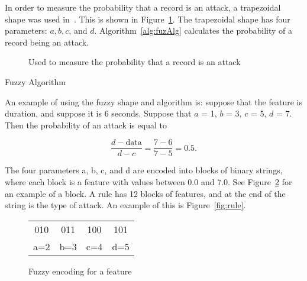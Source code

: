 \documentclass{sig-alternate}
\begin{document}
In order to measure the probability that a record is an attack, a trapezoidal shape was used in~\cite{6496342, 6559603}. This is shown in Figure~\ref{fig:trapFigure}. The trapezoidal shape has four parameters: $a, b, c$, and $d$. Algorithm~\ref{alg:fuzAlg} calculates the probability of a record being an attack.


\begin{figure}
\centering
{}
\caption{Used to measure the probability that a record is an attack}
\label{fig:trapFigure}
\end{figure}

\begin{algorithm}
\caption{Fuzzy Algorithm}
\label{alg:fuzAlg}
\begin{algorithmic}
\ELSE {}
\ENDIF
\end{algorithmic}
\end{algorithm}

An example of using the fuzzy shape and algorithm is: suppose that the feature is duration, and suppose it is 6 seconds. Suppose that $a$ = 1, $b$ = 3, $c$ = 5, $d$ = 7. Then the probability of an attack is equal to

\begin{equation*}
\frac{d-\textrm{data}}{d-c} = \frac{7-6}{7-5} = 0.5.
\end{equation*}


The four parameters a, b, c, and d are encoded into blocks of binary strings, where each block is a feature with values between 0.0 and 7.0. See Figure~\ref{fig:fuzEncodingForFeature} for an example of a block. A rule has 12 blocks of features, and at the end of the string is the type of attack. An example of this is Figure~\ref{fig:rule}.

\begin{figure}
\centering
\caption{Fuzzy encoding for a feature}
\vspace{0.20cm}
\begin{tabular}{|cccc|} \hline
010 & 011 & 100 & 101\\
a=2 & b=3 & c=4 & d=5\\
\hline\end{tabular}
\label{fig:fuzEncodingForFeature}
\end{figure}
\end{document}
